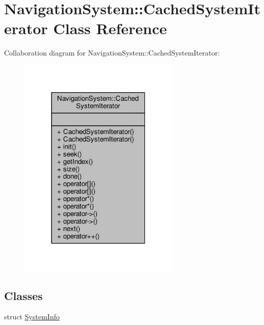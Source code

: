 \hypertarget{classNavigationSystem_1_1CachedSystemIterator}{}\section{Navigation\+System\+:\+:Cached\+System\+Iterator Class Reference}
\label{classNavigationSystem_1_1CachedSystemIterator}


Collaboration diagram for Navigation\+System\+:\+:Cached\+System\+Iterator\+:
\nopagebreak
\begin{figure}[H]
\begin{center}
\leavevmode
\includegraphics[width=217pt]{d6/d10/classNavigationSystem_1_1CachedSystemIterator__coll__graph}
\end{center}
\end{figure}
\subsection*{Classes}
\begin{DoxyCompactItemize}
\item 
struct \hyperlink{structNavigationSystem_1_1CachedSystemIterator_1_1SystemInfo}{System\+Info}
\end{DoxyCompactItemize}
